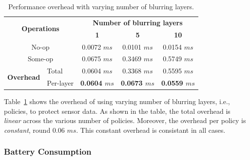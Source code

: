 \begin{table}
\scriptsize
\centering

\bgroup
\def\arraystretch{1.15}%
\begin{tabular}{|l|l|c|c|c|}
\hline
\multicolumn{2}{|c|}{\multirow{2}{*}{\bf Operations}} & 
\multicolumn{3}{c|}{\bf Number of blurring layers} \\\cline{3-5}
\multicolumn{2}{|c|}{} & {\bf 1} & {\bf 5} & {\bf 10} \\\hline

\multicolumn{2}{|c|}{No-op} & 0.0072 $ms$ & 0.0101 $ms$ & 0.0154 $ms$ \\ 

\multicolumn{2}{|c|}{Some-op} & 0.0675 $ms$ & 0.3469 $ms$  & 0.5749 $ms$ \\ \hline

\multirow{2}{*}{\bf Overhead} & Total & 0.0604 $ms$ & 0.3368 $ms$  & 0.5595 $ms$ \\ \cline{2-5}

& Per-layer & {\bf 0.0604 $ms$} & {\bf 0.0673 $ms$} & {\bf 0.0559 $ms$} \\ \hline

\end{tabular}
\egroup

\caption{\small Performance overhead with varying number of blurring layers. }
\label{tab:overhead}
\end{table}

Table~\ref{tab:overhead} shows the overhead of using varying number of 
blurring layers, i.e., policies, to protect sensor data. As shown in the table, 
the total overhead is \textit{linear} across the various number of policies. 
Moreover, the overhead per policy is \textit{constant}, round 0.06 $ms$. This 
constant overhead is consistant in all cases.

\subsubsection{Battery Consumption}

